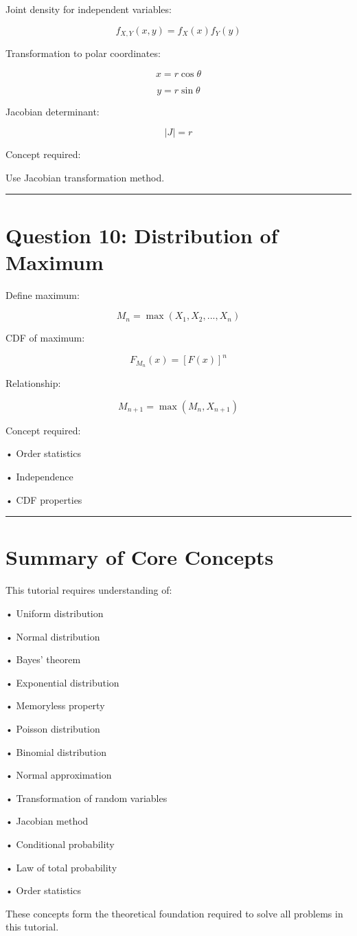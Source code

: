 \documentclass[12pt]{article}
\begin{document}
Joint density for independent variables:

\[
f_{X,Y}(x,y)
=
f_X(x) f_Y(y)
\]

Transformation to polar coordinates:

\[
x = r \cos\theta
\]

\[
y = r \sin\theta
\]

Jacobian determinant:

\[
|J| = r
\]

Concept required:

Use Jacobian transformation method.

\vspace{0.5cm}
\hrule
\vspace{0.5cm}

\section*{Question 10: Distribution of Maximum}

Define maximum:

\[
M_n
=
\max(X_1, X_2, ..., X_n)
\]

CDF of maximum:

\[
F_{M_n}(x)
=
[F(x)]^n
\]

Relationship:

\[
M_{n+1}
=
\max(M_n, X_{n+1})
\]

Concept required:

• Order statistics

• Independence

• CDF properties

\vspace{0.5cm}
\hrule
\vspace{0.5cm}

\section*{Summary of Core Concepts}

This tutorial requires understanding of:

• Uniform distribution

• Normal distribution

• Bayes' theorem

• Exponential distribution

• Memoryless property

• Poisson distribution

• Binomial distribution

• Normal approximation

• Transformation of random variables

• Jacobian method

• Conditional probability

• Law of total probability

• Order statistics

These concepts form the theoretical foundation required to solve all problems in this tutorial.
\end{document}
